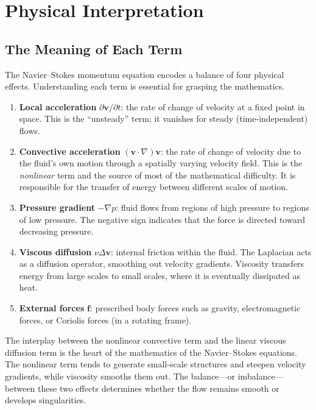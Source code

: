 \section{Physical Interpretation}
\label{sec:NS-physical}

\subsection{The Meaning of Each Term}

The Navier--Stokes momentum equation encodes a balance of four physical effects. Understanding each term is essential for grasping the mathematics.

\begin{enumerate}
\item \textbf{Local acceleration} $\partial \mathbf{v}/\partial t$: the rate of change of velocity at a fixed point in space. This is the ``unsteady'' term; it vanishes for steady (time-independent) flows.

\item \textbf{Convective acceleration} $(\mathbf{v} \cdot \nabla)\mathbf{v}$: the rate of change of velocity due to the fluid's own motion through a spatially varying velocity field. This is the \emph{nonlinear} term and the source of most of the mathematical difficulty. It is responsible for the transfer of energy between different scales of motion.

\item \textbf{Pressure gradient} $-\nabla p$: fluid flows from regions of high pressure to regions of low pressure. The negative sign indicates that the force is directed toward decreasing pressure.

\item \textbf{Viscous diffusion} $\nu \Delta \mathbf{v}$: internal friction within the fluid. The Laplacian acts as a diffusion operator, smoothing out velocity gradients. Viscosity transfers energy from large scales to small scales, where it is eventually dissipated as heat.

\item \textbf{External forces} $\mathbf{f}$: prescribed body forces such as gravity, electromagnetic forces, or Coriolis forces (in a rotating frame).
\end{enumerate}

The interplay between the nonlinear convective term and the linear viscous diffusion term is the heart of the mathematics of the Navier--Stokes equations. The nonlinear term tends to generate small-scale structures and steepen velocity gradients, while viscosity smooths them out. The balance---or imbalance---between these two effects determines whether the flow remains smooth or develops singularities.

